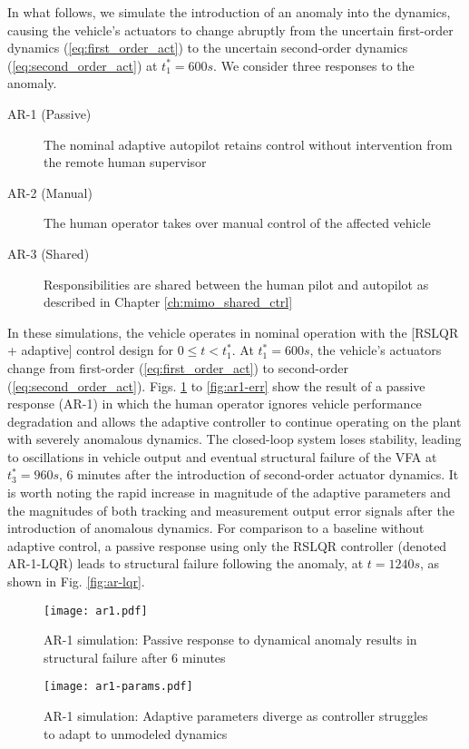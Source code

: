 In what follows, we simulate the introduction of an anomaly into the dynamics, causing the vehicle's actuators to change abruptly from the uncertain first-order dynamics (\ref{eq:first_order_act}) to the uncertain second-order dynamics (\ref{eq:second_order_act}) at $t_1^* = 600s$. We consider three responses to the anomaly.
\begin{description}
	\item[AR-1 (Passive)] The nominal adaptive autopilot retains control without intervention from the remote human supervisor
	\item[AR-2 (Manual)] The human operator takes over manual control of the affected vehicle
	\item[AR-3 (Shared)] Responsibilities are shared between the human pilot and autopilot as described in Chapter \ref{ch:mimo_shared_ctrl}
\end{description}

In these simulations, the vehicle operates in nominal operation with the [RSLQR + adaptive] control design for $0 \leq t < t_1^*$. At $t_1^* = 600 s$, the vehicle's actuators change from first-order (\ref{eq:first_order_act}) to second-order (\ref{eq:second_order_act}). Figs. \ref{fig:ar1} to \ref{fig:ar1-err} show the result of a passive response (AR-1) in which the human operator ignores vehicle performance degradation and allows the adaptive controller to continue operating on the plant with severely anomalous dynamics. The closed-loop system loses stability, leading to oscillations in vehicle output and eventual structural failure of the VFA at $t_3^* = 960s$, 6 minutes after the introduction of second-order actuator dynamics. It is worth noting the rapid increase in magnitude of the adaptive parameters and the magnitudes of both tracking and measurement output error signals after the introduction of anomalous dynamics. For comparison to a baseline without adaptive control, a passive response using only the RSLQR controller (denoted AR-1-LQR) leads to structural failure following the anomaly, at $t = 1240s$, as shown in Fig. \ref{fig:ar-lqr}.

\begin{figure}[htbp]
	\centering
	\texttt{[image: ar1.pdf]}
	\caption{AR-1 simulation: Passive response to dynamical anomaly results in structural failure after 6 minutes}
	\label{fig:ar1}
\end{figure}

\begin{figure}[htbp]
	\centering
	\texttt{[image: ar1-params.pdf]}
	\caption{AR-1 simulation: Adaptive parameters diverge as controller struggles to adapt to unmodeled dynamics}
	\label{fig:ar1-params}
\end{figure}

